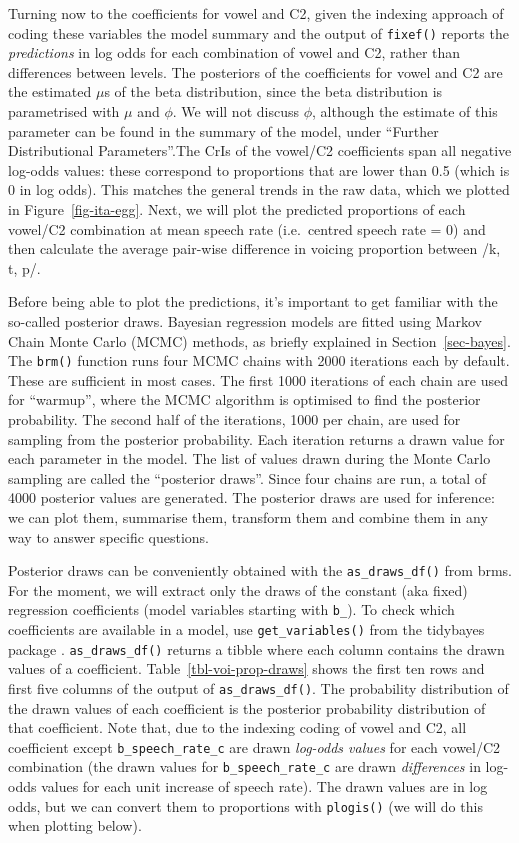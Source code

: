 \documentclass[
  authoryear,
  preprint,
  3p]{elsarticle}
\begin{document}
Turning now to the coefficients for vowel and C2, given the indexing
approach of coding these variables the model summary and the output of
\texttt{fixef()} reports the \emph{predictions} in log odds for each
combination of vowel and C2, rather than differences between levels. The
posteriors of the coefficients for vowel and C2 are the estimated
\(\mu\)s of the beta distribution, since the beta distribution is
parametrised with \(\mu\) and \(\phi\). We will not discuss \(\phi\),
although the estimate of this parameter can be found in the summary of
the model, under ``Further Distributional Parameters''.The CrIs of the
vowel/C2 coefficients span all negative log-odds values: these
correspond to proportions that are lower than 0.5 (which is 0 in log
odds). This matches the general trends in the raw data, which we plotted
in Figure~\ref{fig-ita-egg}. Next, we will plot the predicted
proportions of each vowel/C2 combination at mean speech rate
(i.e.~centred speech rate = 0) and then calculate the average pair-wise
difference in voicing proportion between /k, t, p/.

Before being able to plot the predictions, it's important to get
familiar with the so-called posterior draws. Bayesian regression models
are fitted using Markov Chain Monte Carlo (MCMC) methods, as briefly
explained in Section~\ref{sec-bayes}. The \texttt{brm()} function runs
four MCMC chains with 2000 iterations each by default. These are
sufficient in most cases. The first 1000 iterations of each chain are
used for ``warmup'', where the MCMC algorithm is optimised to find the
posterior probability. The second half of the iterations, 1000 per
chain, are used for sampling from the posterior probability. Each
iteration returns a drawn value for each parameter in the model. The
list of values drawn during the Monte Carlo sampling are called the
``posterior draws''. Since four chains are run, a total of 4000
posterior values are generated. The posterior draws are used for
inference: we can plot them, summarise them, transform them and combine
them in any way to answer specific questions.

Posterior draws can be conveniently obtained with the
\texttt{as\_draws\_df()} from brms. For the moment, we will extract only
the draws of the constant (aka fixed) regression coefficients (model
variables starting with \texttt{b\_}). To check which coefficients are
available in a model, use \texttt{get\_variables()} from the tidybayes
package \citep{kay2019}. \texttt{as\_draws\_df()} returns a tibble where
each column contains the drawn values of a coefficient.
Table~\ref{tbl-voi-prop-draws} shows the first ten rows and first five
columns of the output of \texttt{as\_draws\_df()}. The probability
distribution of the drawn values of each coefficient is the posterior
probability distribution of that coefficient. Note that, due to the
indexing coding of vowel and C2, all coefficient except
\texttt{b\_speech\_rate\_c} are drawn \emph{log-odds values} for each
vowel/C2 combination (the drawn values for \texttt{b\_speech\_rate\_c}
are drawn \emph{differences} in log-odds values for each unit increase
of speech rate). The drawn values are in log odds, but we can convert
them to proportions with \texttt{plogis()} (we will do this when
plotting below).
\end{document}
